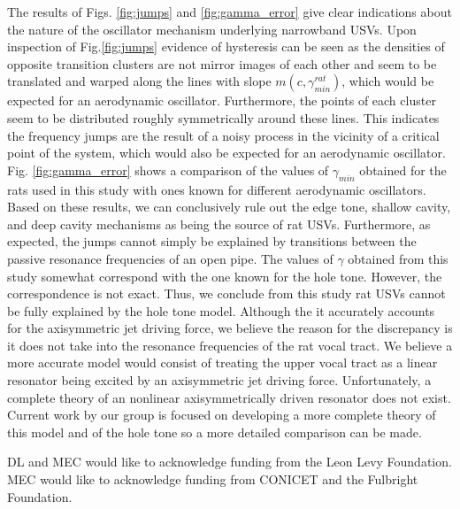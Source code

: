 \documentclass[superscriptaddress, twocolumn, prl]{revtex4}
\begin{document}
The results of Figs. \ref{fig:jumps} and \ref{fig:gamma_error} give clear indications about the nature of the oscillator mechanism underlying narrowband USVs. Upon inspection of Fig.\ref{fig:jumps} evidence of hysteresis can be seen as the densities of opposite transition clusters are not mirror images of each other and seem to be translated and warped along the lines with slope $m\left(c,\gamma_{min}^{rat}\right)$, which would be expected for an aerodynamic oscillator. Furthermore, the points of each cluster seem to be distributed roughly symmetrically around these lines. This indicates the frequency jumps are the result of a noisy process in the vicinity of a critical point of the system, which would also be expected for an aerodynamic oscillator. Fig. \ref{fig:gamma_error} shows a comparison of the values of $\gamma_{min}$ obtained for the rats used in this study with ones known for different aerodynamic oscillators. Based on these results, we can conclusively rule out the edge tone, shallow cavity, and deep cavity mechanisms as being the source of rat USVs. Furthermore, as expected, the jumps cannot simply be explained by transitions between the passive resonance frequencies of an open pipe. The values of $\gamma$ obtained from this study somewhat correspond with the one known for the hole tone. However, the correspondence is not exact. Thus, we conclude from this study rat USVs cannot be fully explained by the hole tone model. Although the it accurately accounts for the axisymmetric jet driving force, we believe the reason for the discrepancy is it does not take into the resonance frequencies of the rat vocal tract. We believe a more accurate model would consist of treating the upper vocal tract as a linear resonator being excited by an axisymmetric jet driving force. Unfortunately, a complete theory of an nonlinear axisymmetrically driven resonator does not exist. Current work by our group is focused on developing a more complete theory of this model and of the hole tone so a more detailed comparison can be made.




\begin{acknowledgments}
DL and MEC would like to acknowledge funding from the Leon Levy Foundation. MEC would like to acknowledge funding from CONICET and the Fulbright Foundation.
\end{acknowledgments}
\end{document}
